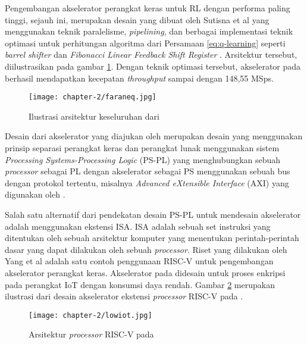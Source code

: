 Pengembangan akselerator perangkat keras untuk \ac{RL} dengan performa paling tinggi, sejauh ini, merupakan desain yang dibuat oleh Sutisna et al \parencite{sutisna2023faraneq} yang menggunakan teknik paralelisme, \textit{pipelining}, dan berbagai implementasi teknik optimasi untuk perhitungan algoritma dari Persamaan \ref{eq:q-learning} seperti \textit{barrel shifter}  dan \textit{Fibonacci Linear Feedback Shift Register} \parencite{panda2012FPGA}. Arsitektur tersebut, diilustrasikan pada gambar \ref{fig:ilustrasi-faraneq}. Dengan teknik optimasi tersebut, akselerator pada \parencite{sutisna2023faraneq} berhasil mendapatkan kecepatan \textit{throughput} sampai dengan 148,55 MSps.


\begin{figure}[h]
	\centering
	\texttt{[image: chapter-2/faraneq.jpg]}
	\caption{Ilustrasi arsitektur keseluruhan dari \parencite{sutisna2023faraneq}}
	\label{fig:ilustrasi-faraneq}
\end{figure}

Desain dari akselerator yang diajukan oleh \parencite{sutisna2023faraneq, dasilva2019parallel, panda2012FPGA} merupakan desain yang menggunakan prinsip separasi perangkat keras dan perangkat lunak menggunakan sistem \textit{Processing Systems-Processing Logic} (PS-PL) yang menghubungkan sebuah \textit{processor} sebagai PL dengan akselerator sebagai PS menggunakan sebuah bus dengan protokol tertentu, misalnya \textit{Advanced eXtensible Interface} (AXI) yang digunakan oleh \parencite{sutisna2023faraneq}.

Salah satu alternatif dari pendekatan desain PS-PL untuk mendesain akselerator adalah menggunakan ekstensi \ac{ISA}. \ac{ISA} adalah sebuah set instruksi yang ditentukan oleh sebuah arsitektur komputer yang menentukan perintah-perintah dasar yang dapat dilakukan oleh sebuah \textit{processor}. Riset yang dilakukan oleh Yang et al \parencite{yang2023design} adalah satu contoh penggunaan RISC-V untuk pengembangan akselerator perangkat keras. Akselerator pada \parencite{yang2023design} didesain untuk proses enkripsi pada perangkat \ac{IoT} dengan konsumsi daya rendah. Gambar \ref{fig:ilustrasi-lowiot} merupakan ilustrasi dari desain akselerator ekstensi \textit{processor} RISC-V pada \parencite{yang2023design}.

\begin{figure}[H]
	\centering
	\texttt{[image: chapter-2/lowiot.jpg]}
	\caption{Arsitektur \textit{processor} RISC-V pada \parencite{yang2023design}}
	\label{fig:ilustrasi-lowiot}
\end{figure}

